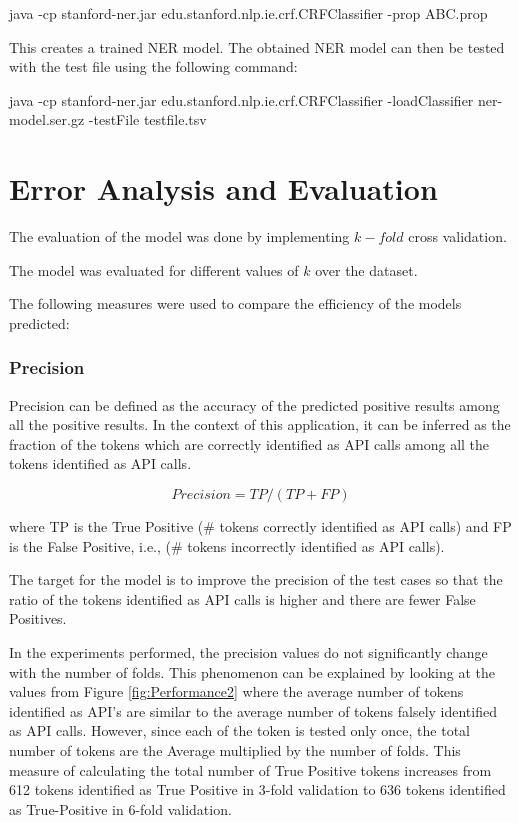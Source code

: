 \documentclass{sig-alternate-05-2015}
\begin{document}
\begin{description}
\item 
java -cp stanford-ner.jar edu.stanford.nlp.ie.crf.CRFClassifier -prop ABC.prop
\end{description}
This creates a trained NER model. The obtained NER model can then be tested with the test file using the following command: 
\begin{description}
\item
java -cp stanford-ner.jar edu.stanford.nlp.ie.crf.CRFClassifier -loadClassifier ner-model.ser.gz -testFile testfile.tsv
\end{description}

\section{Error Analysis and Evaluation}
The evaluation of the model was done by implementing $k-fold$ cross validation. 

The model was evaluated for different values of $k$ over the dataset.

The following measures were used to compare the efficiency of the models predicted:

\subsubsection{Precision}
Precision can be defined as the accuracy of the predicted positive results among all the positive results. In the context of this application, it can be inferred as the fraction of the tokens which are correctly identified as API calls among all the tokens identified as API calls.

\begin{equation}
Precision = TP/(TP+FP)
\end{equation}

where TP is the True Positive (\# tokens correctly identified as API calls) and FP is the False Positive, i.e., (\# tokens incorrectly identified as API calls).

The target for the model is to improve the precision of the test cases so that the ratio of the tokens identified as API calls is higher and there are fewer False Positives.

In the experiments performed, the precision values do not significantly change with the number of folds. This phenomenon can be explained by looking at the values from Figure \ref{fig:Performance2} where the average number of tokens identified as API's are similar to the average number of tokens falsely identified as API calls. However, since each of the token is tested only once, the total number of tokens are the Average multiplied by the number of folds. This measure of calculating the total number of True Positive tokens increases from 612 tokens identified as True Positive in 3-fold validation to 636 tokens identified as True-Positive in 6-fold validation. 
\end{document}
